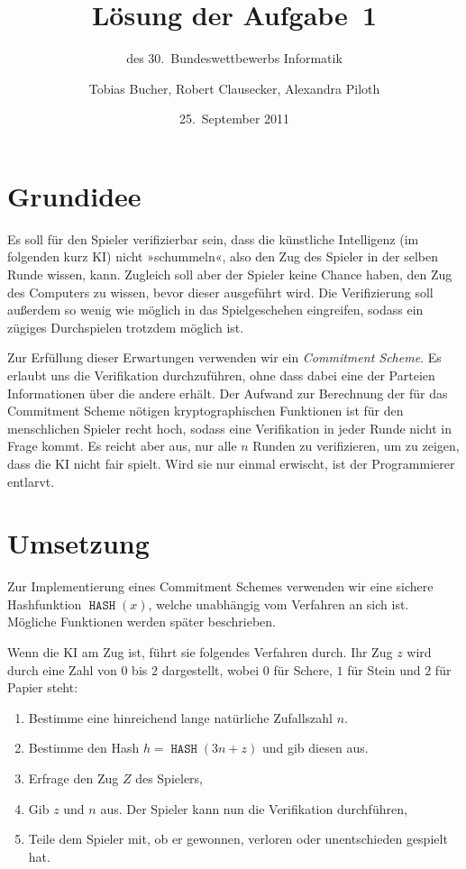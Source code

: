 \documentclass{scrartcl}
\title{Lösung der Aufgabe~1}
\subtitle{des 30.~Bundeswettbewerbs Informatik}
\author{Tobias Bucher, Robert Clausecker, Alexandra Piloth}
\date{25.~September 2011}
\DeclareMathOperator{\hash}{\texttt{HASH}}
\begin{document}
\maketitle

\section{Grundidee}
Es soll für den Spieler verifizierbar sein, dass die künstliche Intelligenz (im
folgenden kurz KI) nicht »schummeln«, also den Zug des Spieler in der selben
Runde wissen, kann.  Zugleich soll aber der Spieler keine Chance haben, den Zug
des Computers zu wissen, bevor dieser ausgeführt wird.  Die Verifizierung soll
außerdem so wenig wie möglich in das Spielgeschehen eingreifen, sodass ein
zügiges Durchspielen trotzdem möglich ist.

Zur Erfüllung dieser Erwartungen verwenden wir ein \emph{Commitment Scheme}.  Es
erlaubt uns die Verifikation durchzuführen, ohne dass dabei eine der Parteien
Informationen über die andere erhält.  Der Aufwand zur Berechnung der für das
Commitment Scheme nötigen kryptographischen Funktionen ist für den menschlichen
Spieler recht hoch, sodass eine Verifikation in jeder Runde nicht in Frage
kommt.  Es reicht aber aus, nur alle $n$ Runden zu verifizieren, um zu zeigen,
dass die KI nicht fair spielt. Wird sie nur einmal erwischt, ist der
Programmierer entlarvt.

\section{Umsetzung}
Zur Implementierung eines Commitment Schemes verwenden wir eine sichere
Hashfunktion $\hash(x)$, welche unabhängig vom Verfahren an sich ist.  Mögliche
Funktionen werden später beschrieben.

Wenn die KI am Zug ist, führt sie folgendes Verfahren durch. Ihr Zug $z$ wird
durch eine Zahl von $0$ bis $2$ dargestellt, wobei $0$ für Schere, $1$ für Stein
und $2$ für Papier steht:
\begin{enumerate}
\item Bestimme eine hinreichend lange natürliche Zufallszahl $n$.
\item Bestimme den Hash $h = \hash(3n+z)$ und gib diesen aus.
\item Erfrage den Zug $Z$ des Spielers,
\item Gib $z$ und $n$ aus. Der Spieler kann nun die Verifikation durchführen,
\item Teile dem Spieler mit, ob er gewonnen, verloren oder unentschieden
  gespielt hat.
\end{enumerate}
\end{document}
